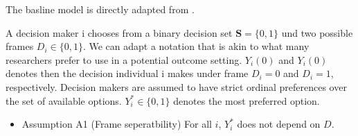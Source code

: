 The basline model is directly adapted from \cite{acquisti2015privacy}.

A decision maker i chooses from a binary decision set $ \textbf{S} = \lbrace 0,1 \rbrace  $ und two possible frames $ D_{i} \in \lbrace 0,1 \rbrace $. 
We can adapt a notation that is akin to what many researchers prefer to use in a potential outcome setting. $ Y_{i}(0) $ and $ Y_{i}(0) $ denotes then the decision individual i makes under frame $ D_{i} = 0 $ and $ D_{i} = 1 $, respectively.
Decision makers are assumed to have strict ordinal preferences over the set of available options. $ Y^{*}_{i} \in \lbrace 0,1 \rbrace $ denotes the most preferred option.  


\begin{itemize}
    \item Assumption A1 (Frame seperatbility) For all $ i $, $ Y^*_{i} $ does not depend on $ D $.
\end{itemize}

